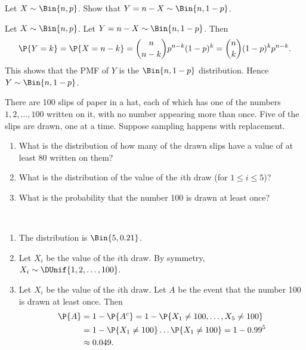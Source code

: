 \begin{exercise}
	Let $X \sim \Bin{n, p}$. Show that $Y = n - X \sim \Bin{n, 1 - p}$.
	\begin{solution}
	 	Let $X \sim \Bin{n, p}$. Let $Y = n - X \sim \Bin{n, 1 - p}$. Then
	 	\begin{equation*}
	 		\P{Y = k} = \P{X = n - k} = \binom{n}{n - k} p^{n - k} (1 - p)^k = \binom{n}{k}	 (1 - p)^k p^{n - k}.
	 	\end{equation*}
	 	This shows that the PMF of $Y$ is the $\Bin{n, 1 - p}$ distribution. Hence $Y \sim \Bin{n, 1 - p}$.
	\end{solution}
\end{exercise}

\begin{exercise}\label{ex:chap03:08}
	There are 100 slips of paper in a hat, each of which has one of the numbers $1,2, \ldots, 100$ written on it, with no number appearing more than once. Five of the slips are drawn, one at a time. Suppose sampling happens with replacement.
	\begin{enumerate}
		\item What is the distribution of how many of the drawn slips have a value of at least $80$ written on them?
		\item What is the distribution of the value of the $i$th draw (for $1 \leq i \leq 5$)?
		\item What is the probability that the number 100 is drawn at least once?
	\end{enumerate}
	\begin{solution}~
	 	\begin{enumerate}
	 		\item The distribution is $\Bin{5, 0.21}$.
	 		\item Let $X_i$ be the value of the $i$th draw. By symmetry, $X_i \sim \DUnif{1, 2, \ldots, 100}$.
	 		\item Let $X_i$ be the value of the $i$th draw. Let $A$ be the event that the number 100 is drawn at least once. Then
	 		\begin{align*}
	 			\P{A} & = 1 - \P{A^c} = 1 - \P{X_1 \neq 100, \ldots, X_5 \neq 100} \\
	 			& = 1 - \P{X_1 \neq 100} \ldots \P{X_1 \neq 100} = 1 - 0.99^5 \\
	 			& \approx 0.049.
	 		\end{align*}
	 	\end{enumerate}
	\end{solution}
\end{exercise}
	 
